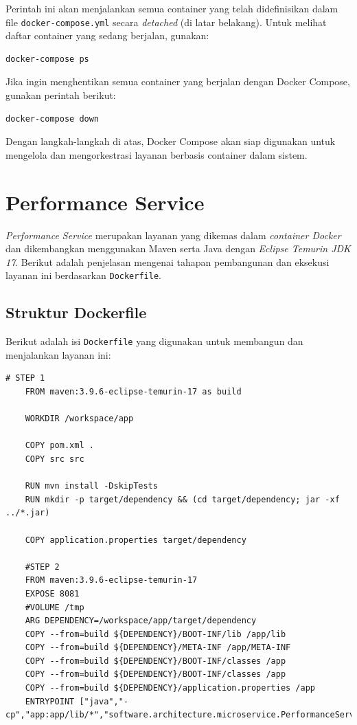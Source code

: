 Perintah ini akan menjalankan semua container yang telah didefinisikan dalam file \texttt{docker-compose.yml} secara \textit{detached} (di latar belakang). Untuk melihat daftar container yang sedang berjalan, gunakan:

\begin{lstlisting}[language=bash]
	docker-compose ps
\end{lstlisting}

Jika ingin menghentikan semua container yang berjalan dengan Docker Compose, gunakan perintah berikut:

\begin{lstlisting}[language=bash]
	docker-compose down
\end{lstlisting}

Dengan langkah-langkah di atas, Docker Compose akan siap digunakan untuk mengelola dan mengorkestrasi layanan berbasis container dalam sistem.



\section{Performance Service}

\textit{Performance Service} merupakan layanan yang dikemas dalam \textit{container Docker} dan dikembangkan menggunakan Maven serta Java dengan \textit{Eclipse Temurin JDK 17}. Berikut adalah penjelasan mengenai tahapan pembangunan dan eksekusi layanan ini berdasarkan \texttt{Dockerfile}.

\subsection{Struktur Dockerfile}

Berikut adalah isi \texttt{Dockerfile} yang digunakan untuk membangun dan menjalankan layanan ini:

\begin{lstlisting}[language=docker]
	# STEP 1
	FROM maven:3.9.6-eclipse-temurin-17 as build
	
	WORKDIR /workspace/app
	
	COPY pom.xml .
	COPY src src
	
	RUN mvn install -DskipTests
	RUN mkdir -p target/dependency && (cd target/dependency; jar -xf ../*.jar)
	
	COPY application.properties target/dependency
	
	#STEP 2
	FROM maven:3.9.6-eclipse-temurin-17
	EXPOSE 8081
	#VOLUME /tmp
	ARG DEPENDENCY=/workspace/app/target/dependency
	COPY --from=build ${DEPENDENCY}/BOOT-INF/lib /app/lib
	COPY --from=build ${DEPENDENCY}/META-INF /app/META-INF
	COPY --from=build ${DEPENDENCY}/BOOT-INF/classes /app
	COPY --from=build ${DEPENDENCY}/BOOT-INF/classes /app
	COPY --from=build ${DEPENDENCY}/application.properties /app
	ENTRYPOINT ["java","-cp","app:app/lib/*","software.architecture.microservice.PerformanceServiceApplication"]
\end{lstlisting}


